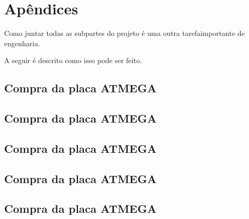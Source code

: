 \chapter{Apêndices}

Como juntar todas as subpartes do projeto é uma outra tarefaimportante de engenharia.

A seguir é descrito como isso pode ser feito.

\section{Compra da placa ATMEGA}
\section{Compra da placa ATMEGA}
\section{Compra da placa ATMEGA}
\section{Compra da placa ATMEGA}
\section{Compra da placa ATMEGA}